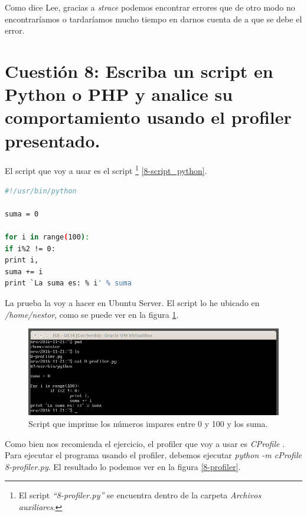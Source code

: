 \documentclass[a4paper,titlepage,12pt]{scrartcl}	%
\numberwithin{figure}{section} %
\numberwithin{table}{section} %
\begin{document}
	Como dice Lee, gracias a \textit{strace} podemos encontrar errores que de otro modo no encontraríamos o tardaríamos mucho tiempo en darnos cuenta de a que se debe el error.
	
	\section[Cuestión 8: Escriba un script en Python o PHP y analice su comportamiento usando el profiler presentado.]{Cuestión 8: Escriba un script en Python o PHP y analice su comportamiento usando el profiler presentado.}
	
	El script que voy a usar es el script \footnote{El script \textit{``8-profiler.py''} se encuentra dentro de la carpeta \textit{Archivos auxiliares}.} \ref{8-script_python}.
		
	\begin{lstlisting}[language=bash, label={8-script_python}]
#!/usr/bin/python

suma = 0

for i in range(100):
if i%2 != 0:
print i,
suma += i
print `La suma es: % i' % suma
	\end{lstlisting}
		
	La prueba la voy a hacer en Ubuntu Server. El script lo he ubicado en \textit{/home/nestor}, como se puede ver en la figura \ref{8-script}.
	\begin{figure}[H]
		\includegraphics[width=\linewidth]{./Imagenes/8-script.png}
		\vspace{-0.5cm}
		\caption[Script que imprime los números impares entre 0 y 100 y los suma.]{Script que imprime los números impares entre 0 y 100 y los suma.}
		\label{8-script}
	\end{figure}
		
	Como bien nos recomienda el ejercicio, el profiler que voy a usar es \textit{CProfile} \cite{cprofile}. Para ejecutar el programa usando el profiler, debemos ejecutar \textit{python -m cProfile 8-profiler.py}. El resultado lo podemos ver en la figura \ref{8-profiler}.
	
\end{document}
